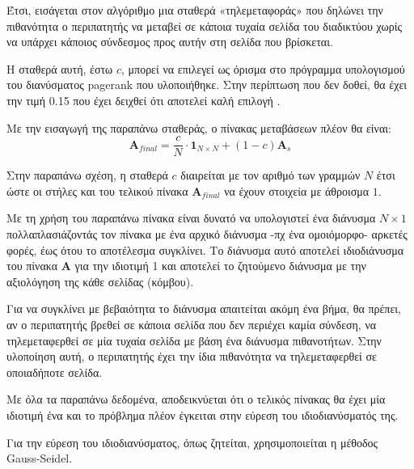 Έτσι, εισάγεται στον αλγόριθμο μια σταθερά «τηλεμεταφοράς» που δηλώνει την πιθανότητα ο περιπατητής να μεταβεί σε κάποια τυχαία σελίδα του διαδικτύου χωρίς να υπάρχει κάποιος σύνδεσμος προς αυτήν στη σελίδα που βρίσκεται.

Η σταθερά αυτή, έστω $c$, μπορεί να επιλεγεί ως όρισμα στο πρόγραμμα υπολογισμού του διανύσματος pagerank που υλοποιήθηκε. Στην περίπτωση που δεν δοθεί, θα έχει την τιμή 0.15 που έχει δειχθεί ότι αποτελεί καλή επιλογή \parencite{brin1998anatomy}.

Με την εισαγωγή της παραπάνω σταθεράς, ο πίνακας μεταβάσεων πλέον θα είναι:
\[
  \bm{A}_{final} = \frac{c}{N}\cdot\bm{1}_{N\times N}+(1-c)\bm{A}_s
\]

Στην παραπάνω σχέση, η σταθερά $c$ διαιρείται με τον αριθμό των γραμμών $N$ έτσι ώστε οι στήλες και του τελικού πίνακα $\bm{A}_{final}$ να έχουν στοιχεία με άθροισμα $1$.

Με τη χρήση του παραπάνω πίνακα είναι δυνατό να υπολογιστεί ένα διάνυσμα $N\times1$ πολλαπλασιάζοντάς τον πίνακα με ένα αρχικό διάνυσμα -πχ ένα ομοιόμορφο- αρκετές φορές, έως ότου το αποτέλεσμα συγκλίνει. Το διάνυσμα αυτό αποτελεί ιδιοδιάνυσμα του πίνακα $\bm{A}$ για την ιδιοτιμή 1 και αποτελεί το ζητούμενο διάνυσμα με την αξιολόγηση της κάθε σελίδας (κόμβου).

Για να συγκλίνει με βεβαιότητα το διάνυσμα απαιτείται ακόμη ένα βήμα, θα πρέπει, αν ο περιπατητής βρεθεί σε κάποια σελίδα που δεν περιέχει καμία σύνδεση, να τηλεμεταφερθεί σε μία τυχαία σελίδα με βάση ένα διάνυσμα πιθανοτήτων. Στην υλοποίηση αυτή, ο περιπατητής έχει την ίδια πιθανότητα να τηλεμεταφερθεί σε οποιαδήποτε σελίδα.

Με όλα τα παραπάνω δεδομένα, αποδεικνύεται ότι ο τελικός πίνακας θα έχει μία ιδιοτιμή ένα και το πρόβλημα πλέον έγκειται στην εύρεση του ιδιοδιανύσματός της.

Για την εύρεση του ιδιοδιανύσματος, όπως ζητείται, χρησιμοποιείται η μέθοδος Gauss-Seidel.

